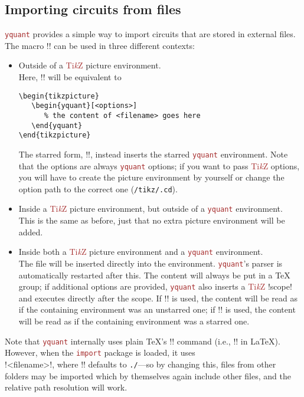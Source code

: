 \documentclass{scrartcl}
\def\TikZ{\textcolor{brown}{Ti\textit kZ}}
\def\pkg#1{\textcolor{brown}{\texttt{#1}}}
\def\texlink{\link\tex}
\def\Yquant{\pkg{yquant}}
\begin{document}
      \subsection[Importing circuit from files]{Importing circuits from files}\label{sec:import}\linkdef\yquantimport
         \Yquant{} provides a simple way to import circuits that are stored in external files.
         The macro \tex!\yquantimport! can be used in three different contexts:
         \begin{itemize}
            \item Outside of a \TikZ{} picture environment. \\
               Here, \tex!! will be equivalent to
               \begin{verbatim}
\begin{tikzpicture}
   \begin{yquant}[<options>]
      % the content of <filename> goes here
   \end{yquant}
\end{tikzpicture}
               \end{verbatim}
               The starred form, \tex!!, instead inserts the starred \Yquant{} environment.
               Note that the options are always \Yquant{} options; if you want to pass \TikZ{} options, you will have to create the picture environment by yourself or change the option path to the correct one (\texttt{/tikz/.cd}).
            \item Inside a \TikZ{} picture environment, but outside of a \Yquant{} environment. \\
               This is the same as before, just that no extra picture environment will be added.
            \item Inside both a \TikZ{} picture environment and a \Yquant{} environment. \\
               The file will be inserted directly into the environment.
               \Yquant's parser is automatically restarted after this.
               The content will always be put in a \TeX{} group; if additional options are provided, \Yquant{} also inserts a \TikZ{} \tex!scope! and executes \texlink[\yquantset]{\yquantset{<options>}} directly after the scope.
               If \tex!\yquantimport! is used, the content will be read as if the containing environment was an unstarred one; if \tex!\yquantimport*! is used, the content will be read as if the containing environment was a starred one.
         \end{itemize}
         Note that \Yquant{} internally uses plain \TeX's \tex!! command (i.e., \tex!\@@import! in \LaTeX).
         \linkdef\yquantimportpath
         However, when the \pkg{import} package is loaded, it uses \\ \tex!{<filename>}!, where \tex!\yquantimportpath! defaults to \texttt{./}---so by changing this, files from other folders may be imported which by themselves again include other files, and the relative path resolution will work.
\end{document}

